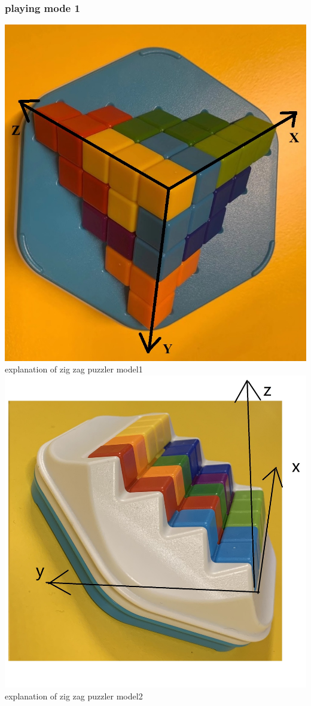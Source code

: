 \subsubsection{playing mode 1}
\label{sec:playing mode 1}
\begin{center}
\includegraphics[scale=0.5]{figs/ZIGZAGmodel1board.jpg} \\
explanation of zig zag puzzler model1\\
\includegraphics[scale=0.2]{figs/ZIGZAGmodel2board.jpg} \\
explanation of zig zag puzzler model2
\end{center}
